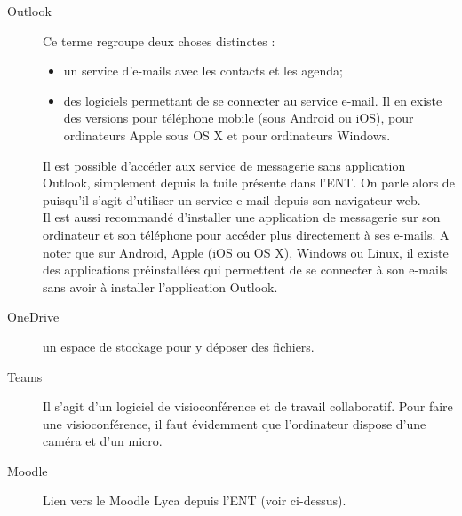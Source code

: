 \documentclass[10pt,a4paper]{report}
\begin{document}
\begin{description}
	\item[Outlook] Ce terme regroupe deux choses distinctes :
		\begin{itemize}
			\item un service d'e-mails avec les contacts et les agenda;
			\item des logiciels permettant de se connecter au service e-mail. Il en existe des versions pour téléphone mobile (sous Android ou iOS), pour ordinateurs Apple sous OS X et pour ordinateurs Windows.
		\end{itemize}
		Il est possible d'accéder aux service de messagerie sans application Outlook, simplement depuis la tuile présente dans l'ENT. On parle alors de  puisqu'il s'agit d'utiliser un service e-mail depuis son navigateur web. \\
		Il est aussi recommandé d'installer une application de messagerie sur son ordinateur et son téléphone pour accéder plus directement à ses e-mails. A noter que sur Android, Apple (iOS ou OS X), Windows ou Linux, il existe des applications préinstallées qui permettent de se connecter à son e-mails sans avoir à installer l'application Outlook.
	\item[OneDrive] un espace de stockage pour y déposer des fichiers.
	\item[Teams] Il s'agit d'un logiciel de visioconférence et de travail collaboratif. Pour faire une visioconférence, il faut évidemment que l'ordinateur dispose d'une caméra et d'un micro.
	\item[Moodle] Lien vers le Moodle Lyca depuis l'ENT (voir ci-dessus).
\end{description}


\end{document}
